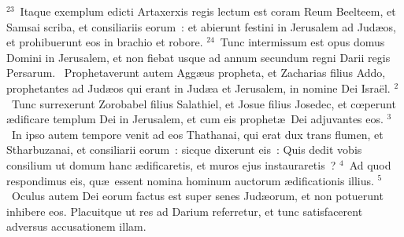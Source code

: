 ${}^{23}$~Itaque exemplum edicti Artaxerxis regis lectum est coram Reum Beelteem, et Samsai scriba, et consiliariis eorum~: et abierunt festini in Jerusalem ad Jud\ae os, et prohibuerunt eos in brachio et robore.
${}^{24}$~Tunc intermissum est opus domus Domini in Jerusalem, et non fiebat usque ad annum secundum regni Darii regis Persarum.
~Prophetaverunt autem Agg\ae us propheta, et Zacharias filius Addo, prophetantes ad Jud\ae os qui erant in Jud\ae a et Jerusalem, in nomine Dei Isra\"el.
${}^{2}$~Tunc surrexerunt Zorobabel filius Salathiel, et Josue filius Josedec, et cœperunt \ae dificare templum Dei in Jerusalem, et cum eis prophet\ae\ Dei adjuvantes eos.
${}^{3}$~In ipso autem tempore venit ad eos Thathanai, qui erat dux trans flumen, et Stharbuzanai, et consiliarii eorum~: sicque dixerunt eis~: Quis dedit vobis consilium ut domum hanc \ae dificaretis, et muros ejus instauraretis~?
${}^{4}$~Ad quod respondimus eis, qu\ae\ essent nomina hominum auctorum \ae dificationis illius.
${}^{5}$~Oculus autem Dei eorum factus est super senes Jud\ae orum, et non potuerunt inhibere eos. Placuitque ut res ad Darium referretur, et tunc satisfacerent adversus accusationem illam.


